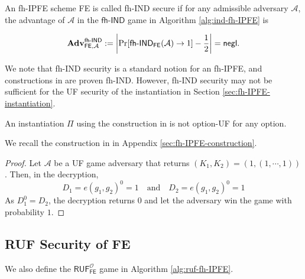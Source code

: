 \begin{definition}

	An fh-IPFE scheme \textsf{FE} is called fh-IND secure if for any admissible adversary $\mathcal{A}$, the advantage of $\mathcal{A}$ in the $\textsf{fh-IND}$ game in Algorithm \ref{alg:ind-fh-IPFE} is

\[
	\mathbf{Adv}_{\textsf{FE}, \mathcal{A}}^{\textsf{fh-IND}} := \left| \Pr[\textsf{fh-IND}_{\textsf{FE}}(\mathcal{A}) \to 1 ] - \frac{1}{2} \right| = \mathsf{negl}.
\]

\end{definition}

We note that fh-IND security is a standard notion for an fh-IPFE, and constructions in \cite{cryptoeprint:2015/1255, 10.1007/978-3-319-45871-7_24, cryptoeprint:2016/440} are proven fh-IND. However, fh-IND security may not be sufficient for the UF security of the instantiation in Section \ref{sec:fh-IPFE-instantiation}. 

\begin{theorem}

An instantiation $\Pi$ using the construction in \cite{cryptoeprint:2016/440} is not \textsf{option}-UF for any \textsf{option}.

\end{theorem}

\noindent We recall the construction in \cite{cryptoeprint:2016/440} in Appendix \ref{sec:fh-IPFE-construction}.

\begin{proof}

Let $\mathcal{A}$ be a \textsf{UF} game adversary that returns $(K_1, K_2) = (1, (1, \cdots, 1))$. Then, in the decryption,
\[
	D_1 = e(g_1, g_2)^{0} = 1 \quad \text{and} \quad D_2 = e(g_1, g_2)^0 = 1
\]
As $D_1^0 = D_2$, the decryption returns $0$ and let the adversary win the game with probability $1$.

\end{proof}


\subsection{RUF Security of \textsf{FE}}
\label{sec:security_analysis:fh-IPFE:ruf}

We also define the $\textsf{RUF}^{\mathcal{O}}_\textsf{FE}$ game in Algorithm \ref{alg:ruf-fh-IPFE}.

